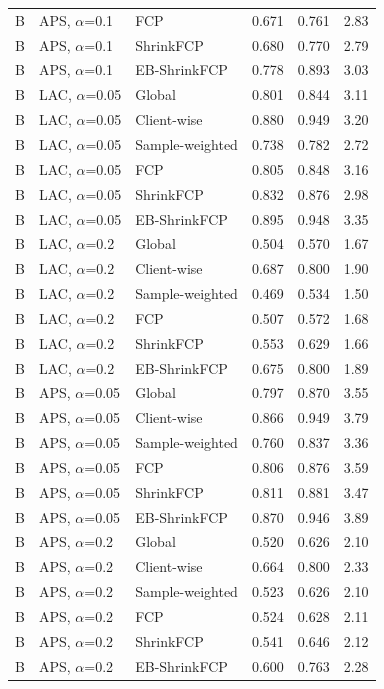 \documentclass[10pt]{article}
\begin{document}
\begin{table}[!htbp]
\begin{tabular}{@{}lllrrr@{}}
B & APS, $\alpha$=0.1 & FCP & 0.671 & 0.761 & 2.83 \\
B & APS, $\alpha$=0.1 & ShrinkFCP & 0.680 & 0.770 & 2.79 \\
B & APS, $\alpha$=0.1 & EB-ShrinkFCP & 0.778 & 0.893 & 3.03 \\
\midrule
B & LAC, $\alpha$=0.05 & Global & 0.801 & 0.844 & 3.11 \\
B & LAC, $\alpha$=0.05 & Client-wise & 0.880 & 0.949 & 3.20 \\
B & LAC, $\alpha$=0.05 & Sample-weighted & 0.738 & 0.782 & 2.72 \\
B & LAC, $\alpha$=0.05 & FCP & 0.805 & 0.848 & 3.16 \\
B & LAC, $\alpha$=0.05 & ShrinkFCP & 0.832 & 0.876 & 2.98 \\
B & LAC, $\alpha$=0.05 & EB-ShrinkFCP & 0.895 & 0.948 & 3.35 \\
\midrule
B & LAC, $\alpha$=0.2 & Global & 0.504 & 0.570 & 1.67 \\
B & LAC, $\alpha$=0.2 & Client-wise & 0.687 & 0.800 & 1.90 \\
B & LAC, $\alpha$=0.2 & Sample-weighted & 0.469 & 0.534 & 1.50 \\
B & LAC, $\alpha$=0.2 & FCP & 0.507 & 0.572 & 1.68 \\
B & LAC, $\alpha$=0.2 & ShrinkFCP & 0.553 & 0.629 & 1.66 \\
B & LAC, $\alpha$=0.2 & EB-ShrinkFCP & 0.675 & 0.800 & 1.89 \\
\midrule
B & APS, $\alpha$=0.05 & Global & 0.797 & 0.870 & 3.55 \\
B & APS, $\alpha$=0.05 & Client-wise & 0.866 & 0.949 & 3.79 \\
B & APS, $\alpha$=0.05 & Sample-weighted & 0.760 & 0.837 & 3.36 \\
B & APS, $\alpha$=0.05 & FCP & 0.806 & 0.876 & 3.59 \\
B & APS, $\alpha$=0.05 & ShrinkFCP & 0.811 & 0.881 & 3.47 \\
B & APS, $\alpha$=0.05 & EB-ShrinkFCP & 0.870 & 0.946 & 3.89 \\
\midrule
B & APS, $\alpha$=0.2 & Global & 0.520 & 0.626 & 2.10 \\
B & APS, $\alpha$=0.2 & Client-wise & 0.664 & 0.800 & 2.33 \\
B & APS, $\alpha$=0.2 & Sample-weighted & 0.523 & 0.626 & 2.10 \\
B & APS, $\alpha$=0.2 & FCP & 0.524 & 0.628 & 2.11 \\
B & APS, $\alpha$=0.2 & ShrinkFCP & 0.541 & 0.646 & 2.12 \\
B & APS, $\alpha$=0.2 & EB-ShrinkFCP & 0.600 & 0.763 & 2.28 \\
\bottomrule
\end{tabular}
\end{table}
\end{document}
